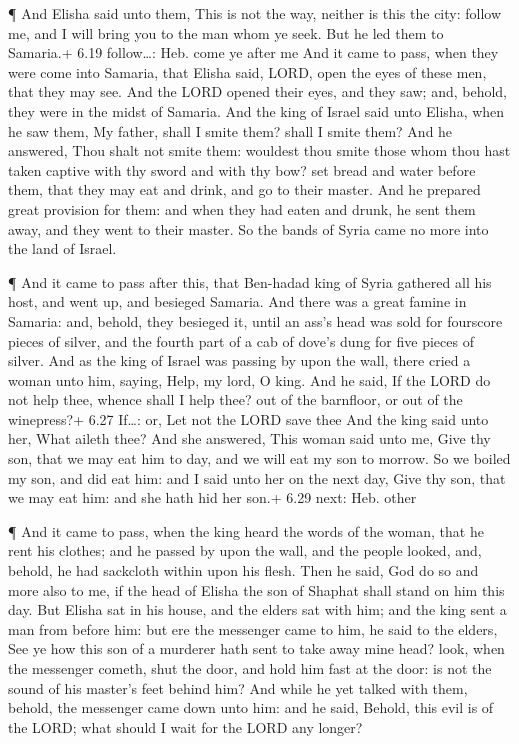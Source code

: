  ¶ And Elisha said unto them, This is not the way, neither
is this the city: follow me, and I will bring you to the man whom ye
seek. But he led them to Samaria.+ 6.19 follow\ldots: Heb. come ye after
me  And it came to pass, when they were come into Samaria,
that Elisha said, LORD, open the eyes of these men, that they may see.
And the LORD opened their eyes, and they saw; and, behold, they were in
the midst of Samaria.  And the king of Israel said unto
Elisha, when he saw them, My father, shall I smite them? shall I smite
them?  And he answered, Thou shalt not smite them: wouldest
thou smite those whom thou hast taken captive with thy sword and with
thy bow? set bread and water before them, that they may eat and drink,
and go to their master.  And he prepared great provision
for them: and when they had eaten and drunk, he sent them away, and they
went to their master. So the bands of Syria came no more into the land
of Israel.

 ¶ And it came to pass after this, that Ben-hadad king of
Syria gathered all his host, and went up, and besieged Samaria.
 And there was a great famine in Samaria: and, behold, they
besieged it, until an ass's head was sold for fourscore pieces of
silver, and the fourth part of a cab of dove's dung for five pieces of
silver.  And as the king of Israel was passing by upon the
wall, there cried a woman unto him, saying, Help, my lord, O king.
 And he said, If the LORD do not help thee, whence shall I
help thee? out of the barnfloor, or out of the winepress?+ 6.27
If\ldots: or, Let not the LORD save thee  And the king said
unto her, What aileth thee? And she answered, This woman said unto me,
Give thy son, that we may eat him to day, and we will eat my son to
morrow.  So we boiled my son, and did eat him: and I said
unto her on the next day, Give thy son, that we may eat him: and she
hath hid her son.+ 6.29 next: Heb. other

 ¶ And it came to pass, when the king heard the words of
the woman, that he rent his clothes; and he passed by upon the wall, and
the people looked, and, behold, he had sackcloth within upon his flesh.
 Then he said, God do so and more also to me, if the head
of Elisha the son of Shaphat shall stand on him this day. 
But Elisha sat in his house, and the elders sat with him; and the king
sent a man from before him: but ere the messenger came to him, he said
to the elders, See ye how this son of a murderer hath sent to take away
mine head? look, when the messenger cometh, shut the door, and hold him
fast at the door: is not the sound of his master's feet behind him?
 And while he yet talked with them, behold, the messenger
came down unto him: and he said, Behold, this evil is of the LORD; what
should I wait for the LORD any longer?

